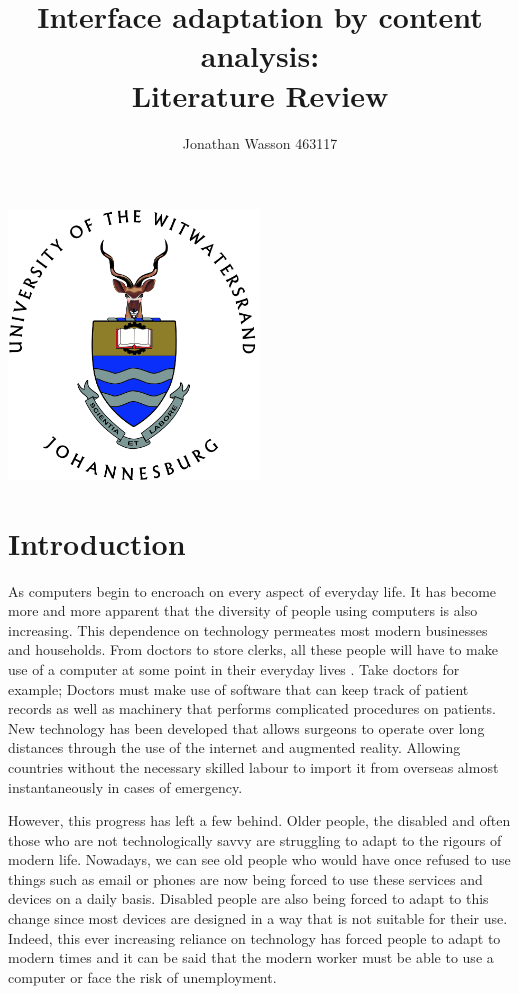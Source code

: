 \documentclass[11pt]{article}
\title{Interface adaptation by content analysis:\\
Literature Review}
\author{Jonathan Wasson 463117}
\begin{document}
\nocite{*}
\maketitle

\begin{center}
    \includegraphics[width=0.5\textwidth]{WITS-logo.jpg}
\end{center}

\clearpage
\tableofcontents


\clearpage
\section{Introduction}

As computers begin to encroach on every aspect of everyday life. It has become more and more apparent that the diversity of people using computers is also increasing. This dependence on technology permeates most modern businesses and households. From doctors to store clerks, all these people will have to make use of a computer at some point in their everyday lives \citep{beaudry2005understanding}. Take doctors for example; Doctors must make use of software that can keep track of patient records as well as machinery that performs complicated procedures on patients. New technology has been developed that allows surgeons to operate over long distances through the use of the internet and augmented reality. Allowing countries without the necessary skilled labour to import it from overseas almost instantaneously in cases of emergency.
\vspace{6.0 mm}

However, this progress has left a few behind. Older people, the disabled and often those who are not technologically savvy are struggling to adapt to the rigours of modern life. Nowadays, we can see old people who would have once refused to use things such as email or phones are now being forced to use these services and devices on a daily basis. Disabled people \citep{gajos2008improving} are also being forced to adapt to this change since most devices are designed in a way that is not suitable for their use. Indeed, this ever increasing reliance on technology has forced people to adapt to modern times and it can be said that the modern worker must be able to use a computer or face the risk of unemployment.
\vspace{6.0 mm}
\end{document}
